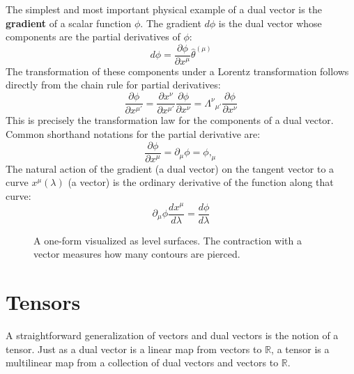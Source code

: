 \documentclass[11pt, a4paper]{report}
\begin{document}
The simplest and most important physical example of a dual vector is the \textbf{gradient} of a scalar function $\phi$. The gradient $d\phi$ is the dual vector whose components are the partial derivatives of $\phi$:
\begin{equation}
    d\phi = \frac{\partial\phi}{\partial x^\mu} \hat{\theta}^{(\mu)}
\end{equation}
The transformation of these components under a Lorentz transformation follows directly from the chain rule for partial derivatives:
\begin{equation}
    \frac{\partial\phi}{\partial x^{\mu'}} = \frac{\partial x^\nu}{\partial x^{\mu'}} \frac{\partial\phi}{\partial x^\nu} = {\Lambda^\nu}_{\mu'} \frac{\partial\phi}{\partial x^\nu}
\end{equation}
This is precisely the transformation law for the components of a dual vector. Common shorthand notations for the partial derivative are:
\begin{equation}
    \frac{\partial\phi}{\partial x^\mu} = \partial_\mu \phi = \phi,_\mu
\end{equation}
The natural action of the gradient (a dual vector) on the tangent vector to a curve $x^\mu(\lambda)$ (a vector) is the ordinary derivative of the function along that curve:
\begin{equation}
    \partial_\mu\phi \frac{dx^\mu}{d\lambda} = \frac{d\phi}{d\lambda}
\end{equation}
\begin{figure}[h]
\centering
{}
\caption{A one-form visualized as level surfaces. The contraction with a vector measures how many contours are pierced.}
\end{figure}
\section{Tensors}

A straightforward generalization of vectors and dual vectors is the notion of a tensor. Just as a dual vector is a linear map from vectors to $\mathbb{R}$, a tensor is a multilinear map from a collection of dual vectors and vectors to $\mathbb{R}$.
\end{document}
